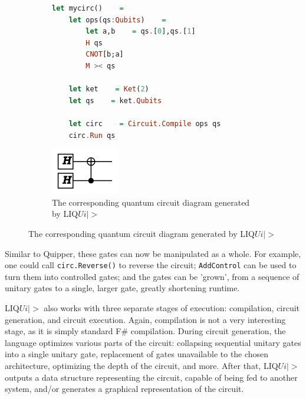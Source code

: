 \documentclass[]{article}
\begin{document}
\begin{figure}
	\label{fig:liquid_1}
	\caption{A simple example of functions in LIQ$Ui|>$}
	\begin{subfigure}{0.7\textwidth}
		\begin{lstlisting}[language=Haskell]
let mycirc()    =
	let ops(qs:Qubits)    =
		let a,b    = qs.[0],qs.[1]
		H qs
		CNOT[b;a]
		M >< qs
	
	let ket    = Ket(2)
	let qs    = ket.Qubits
	
	let circ    = Circuit.Compile ops qs
	circ.Run qs
		\end{lstlisting}
	\end{subfigure}
	\begin{subfigure}{0.3\textwidth}
		\includegraphics[width=0.9\linewidth]{liquid_1}
		\caption{The corresponding quantum circuit diagram generated by LIQ$Ui|>$}
	\end{subfigure}
\end{figure}

Similar to Quipper, these gates can now be manipulated as a whole. For example, one could call \texttt{circ.Reverse()} to reverse the circuit; \texttt{AddControl} can be used to turn them into controlled gates; and the gates can be 'grown', from a sequence of unitary gates to a single, larger gate, greatly shortening runtime.

LIQ$Ui|>$ also works with three separate stages of execution: compilation, circuit generation, and circuit execution. Again, compilation is not a very interesting stage, as it is simply standard F\# compilation. During circuit generation, the language optimizes various parts of the circuit: collapsing sequential unitary gates into a single unitary gate, replacement of gates unavailable to the chosen architecture, optimizing the depth of the circuit, and more. After that, LIQ$Ui|>$ outputs a data structure representing the circuit, capable of being fed to another system, and/or generates a graphical representation of the circuit.
\end{document}
